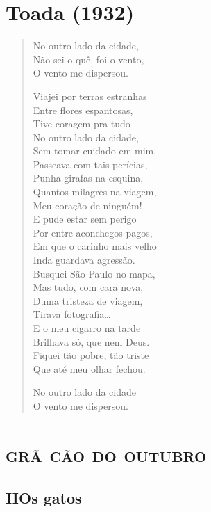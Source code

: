 \chapter[Toada]{Toada (1932)}

\begin{verse}
No outro lado da cidade,\\
Não sei o quê, foi o vento,\\
O vento me dispersou.

Viajei por terras estranhas\\
Entre flores espantosas,\\
Tive coragem pra tudo\\
No outro lado da cidade,\\
Sem tomar cuidado em mim.\\
Passeava com tais perícias,\\
Punha girafas na esquina,\\
Quantos milagres na viagem,\\
Meu coração de ninguém!\\
E pude estar sem perigo\\
Por entre aconchegos pagos,\\
Em que o carinho mais velho\\
Inda guardava agressão.\\
Busquei São Paulo no mapa,\\
Mas tudo, com cara nova,\\
Duma tristeza de viagem,\\
Tirava fotografia\ldots{}\\
E o meu cigarro na tarde\\
Brilhava só, que nem Deus.\\
Fiquei tão pobre, tão triste\\
Que até meu olhar fechou.

No outro lado da cidade\\
O vento me dispersou.
\end{verse}

\chapter[\textsc{grã cão do outubro}\\\textsc{ii} -- Os gatos]{\textsc{grã cão do outubro}}

\section*{II\break Os gatos}

